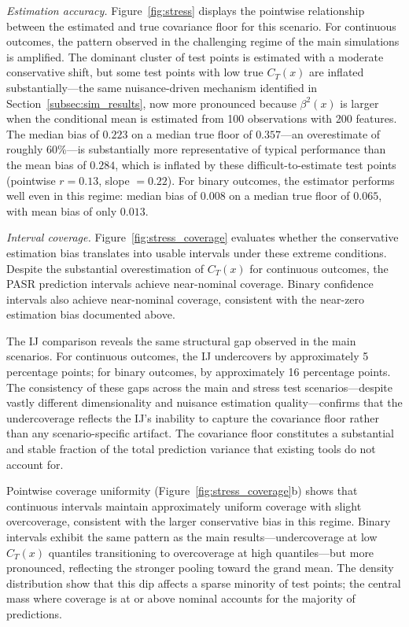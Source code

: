 \documentclass[11pt]{article}
\theoremstyle{plain}
\theoremstyle{definition}
\theoremstyle{remark}
\begin{document}
\medskip
\noindent\textit{Estimation accuracy.}\quad
Figure~\ref{fig:stress} displays the pointwise relationship between the estimated and true covariance floor for this scenario. For continuous outcomes, the pattern observed in the challenging regime of the main simulations is amplified. The dominant cluster of test points is estimated with a moderate conservative shift, but some test points with low true $C_T(x)$ are inflated substantially---the same nuisance-driven mechanism identified in Section~\ref{subsec:sim_results}, now more pronounced because $\beta^2(x)$ is larger when the conditional mean is estimated from 100 observations with 200 features. The median bias of $0.223$ on a median true floor of $0.357$---an overestimate of roughly 60\%---is substantially more representative of typical performance than the mean bias of $0.284$, which is inflated by these difficult-to-estimate test points (pointwise $r = 0.13$, slope $= 0.22$). For binary outcomes, the estimator performs well even in this regime: median bias of $0.008$ on a median true floor of $0.065$, with mean bias of only $0.013$.

\medskip
\noindent\textit{Interval coverage.}\quad
Figure~\ref{fig:stress_coverage} evaluates whether the conservative estimation bias translates into usable intervals under these extreme conditions. Despite the substantial overestimation of $C_T(x)$ for continuous outcomes, the PASR prediction intervals achieve near-nominal coverage. Binary confidence intervals also achieve near-nominal coverage, consistent with the near-zero estimation bias documented above.

The IJ comparison reveals the same structural gap observed in the main scenarios. For continuous outcomes, the IJ undercovers by approximately 5 percentage points; for binary outcomes, by approximately 16 percentage points. The consistency of these gaps across the main and stress test scenarios---despite vastly different dimensionality and nuisance estimation quality---confirms that the undercoverage reflects the IJ's inability to capture the covariance floor rather than any scenario-specific artifact. The covariance floor constitutes a substantial and stable fraction of the total prediction variance that existing tools do not account for.

Pointwise coverage uniformity (Figure~\ref{fig:stress_coverage}b) shows that continuous intervals maintain approximately uniform coverage with slight overcoverage, consistent with the larger conservative bias in this regime. Binary intervals exhibit the same pattern as the main results---undercoverage at low $C_T(x)$ quantiles transitioning to overcoverage at high quantiles---but more pronounced, reflecting the stronger pooling toward the grand mean. The density distribution show that this dip affects a sparse minority of test points; the central mass where coverage is at or above nominal accounts for the majority of predictions.
\end{document}
